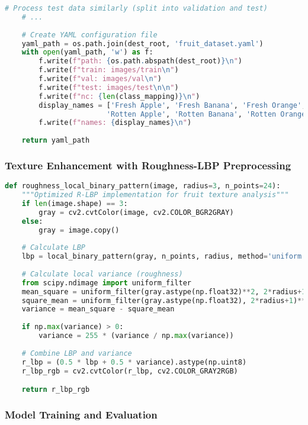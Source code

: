 \begin{lstlisting}[language=Python, caption={Fruit Dataset Preparation}, label={lst:fruit-dataset}]
    # Process test data similarly (split into validation and test)
    # ...
    
    # Create YAML configuration file
    yaml_path = os.path.join(dest_root, 'fruit_dataset.yaml')
    with open(yaml_path, 'w') as f:
        f.write(f"path: {os.path.abspath(dest_root)}\n")
        f.write(f"train: images/train\n")
        f.write(f"val: images/val\n")
        f.write(f"test: images/test\n\n")
        f.write(f"nc: {len(class_mapping)}\n")
        display_names = ['Fresh Apple', 'Fresh Banana', 'Fresh Orange',
                        'Rotten Apple', 'Rotten Banana', 'Rotten Orange']
        f.write(f"names: {display_names}\n")
        
    return yaml_path
\end{lstlisting}

\subsubsection{Texture Enhancement with Roughness-LBP Preprocessing}

\begin{lstlisting}[language=Python, caption={R-LBP Preprocessing for Fruit Texture Enhancement}, label={lst:fruit-rlbp}]
def roughness_local_binary_pattern(image, radius=3, n_points=24):
    """Optimized R-LBP implementation for fruit texture analysis"""
    if len(image.shape) == 3:
        gray = cv2.cvtColor(image, cv2.COLOR_BGR2GRAY)
    else:
        gray = image.copy()
    
    # Calculate LBP
    lbp = local_binary_pattern(gray, n_points, radius, method='uniform')
    
    # Calculate local variance (roughness)
    from scipy.ndimage import uniform_filter
    mean_square = uniform_filter(gray.astype(np.float32)**2, 2*radius+1)
    square_mean = uniform_filter(gray.astype(np.float32), 2*radius+1)**2
    variance = mean_square - square_mean
    
    if np.max(variance) > 0:
        variance = 255 * (variance / np.max(variance))
    
    # Combine LBP and variance
    r_lbp = (0.5 * lbp + 0.5 * variance).astype(np.uint8)
    r_lbp_rgb = cv2.cvtColor(r_lbp, cv2.COLOR_GRAY2RGB)

    return r_lbp_rgb
\end{lstlisting}

\subsubsection{Model Training and Evaluation}

